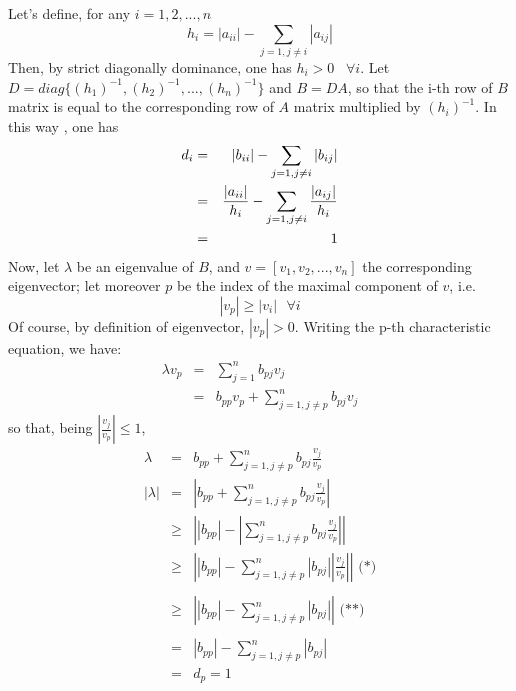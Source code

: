\documentclass[12pt]{article}
\begin{document}
Let's define, for any $i=1,2,...,n$%
\[
h_{i}=\left\vert a_{ii}\right\vert -\sum_{j=1,j\neq i}\left\vert
a_{ij}\right\vert 
\]
Then, by strict diagonally dominance, one has $h_{i}>0$ \ $\forall i$.
Let $D=diag\{\left( h_{1}\right) ^{-1},\left( h_{2}\right)
^{-1},...,\left( h_{n}\right) ^{-1}\}$ and $B=DA$, so that the i-th row of $B
$ matrix is equal to the corresponding row of $A$ matrix multiplied by $%
\left( h_{i}\right) ^{-1}$. In this way , one has
\begin{eqnarray*}
d_{i} &=&\left\vert b_{ii}\right\vert -\sum_{j=1,j\neq i}\left\vert
b_{ij}\right\vert  \\
&=&\frac{\left\vert a_{ii}\right\vert }{h_{i}}-\sum_{j=1,j\neq i}\frac{%
\left\vert a_{ij}\right\vert }{h_{i}} \\
&=&1
\end{eqnarray*}
Now, let $\lambda $ be an eigenvalue of $B$, and $v=[v_{1},v_{2},...,v_{n}]$
the corresponding eigenvector; let moreover $p$ be the index of the maximal
component of $v$, i.e. 
\[
\left\vert v_{p}\right\vert \geq \left\vert v_{i}\right\vert \text{ \ }%
\forall i
\]
Of course, by definition of eigenvector, $\left\vert v_{p}\right\vert >0$.
Writing the p-th characteristic equation, we have:%
\begin{eqnarray*}
\lambda v_{p} &=&\sum_{j=1}^{n}b_{pj}v_{j} \\
&=&b_{pp}v_{p}+\sum_{j=1,j\neq p}^{n}b_{pj}v_{j}
\end{eqnarray*}
so that, being $\left\vert \frac{v_{j}}{v_{p}}\right\vert \leq 1$,%
\begin{eqnarray*}
\lambda  &=&b_{pp}+\sum_{j=1,j\neq p}^{n}b_{pj}\frac{v_{j}}{v_{p}} \\
\left\vert \lambda \right\vert  &=&\left\vert b_{pp}+\sum_{j=1,j\neq
p}^{n}b_{pj}\frac{v_{j}}{v_{p}}\right\vert  \\
&\geq &\left\vert \left\vert b_{pp}\right\vert -\left\vert \sum_{j=1,j\neq
p}^{n}b_{pj}\frac{v_{j}}{v_{p}}\right\vert \right\vert  \\
&\geq &\left\vert \left\vert b_{pp}\right\vert -\sum_{j=1,j\neq
p}^{n}\left\vert b_{pj}\right\vert \left\vert \frac{v_{j}}{v_{p}}\right\vert
\right\vert \text{ \ \ \ \ \ \ \ \ \ (*)} \\  \\
&\geq &\left\vert \left\vert b_{pp}\right\vert -\sum_{j=1,j\neq
p}^{n}\left\vert b_{pj}\right\vert \right\vert \text{ \ \ \ \ \ \ \ \ \ (**)} \\  \\
&=&\left\vert b_{pp}\right\vert -\sum_{j=1,j\neq p}^{n}\left\vert
b_{pj}\right\vert  \\
&=&d_{p}=1
\end{eqnarray*}
\end{document}

